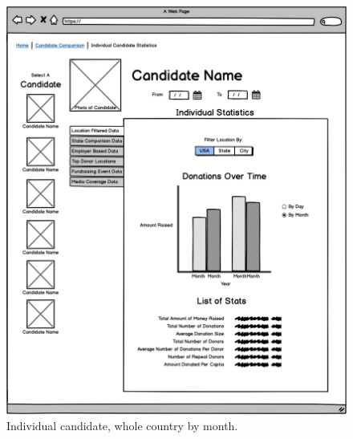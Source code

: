 \documentclass[12pt]{article}
\begin{document}
    \begin{figure}[H]
        \begin{center}
        \includegraphics[scale=.30]{candidatefilterusmonth}
        \caption{Individual candidate, whole country by month.}
        \label{fig:6}
        \end{center}
    \end{figure}
    
\end{document}
